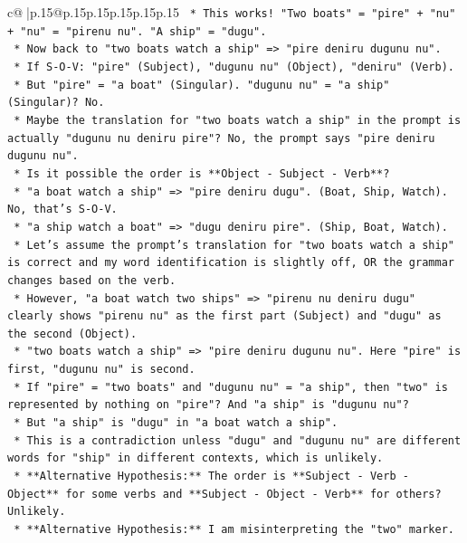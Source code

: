 \documentclass{article}
\begin{document}
{\begin{supertabular}{c@{$\;$}|p{.15\linewidth}@{}p{.15\linewidth}p{.15\linewidth}p{.15\linewidth}p{.15\linewidth}p{.15\linewidth}}
{{{\texttt{        *   This works! "Two boats" = "pire" + "nu" + "nu" = "pirenu nu". "A ship" = "dugu".} \\
\texttt{        *   Now back to "two boats watch a ship" => "pire deniru dugunu nu".} \\
\texttt{        *   If S{-}O{-}V: "pire" (Subject), "dugunu nu" (Object), "deniru" (Verb).} \\
\texttt{        *   But "pire" = "a boat" (Singular). "dugunu nu" = "a ship" (Singular)? No.} \\
\texttt{        *   Maybe the translation for "two boats watch a ship" in the prompt is actually "dugunu nu deniru pire"? No, the prompt says "pire deniru dugunu nu".} \\
\texttt{        *   Is it possible the order is **Object {-} Subject {-} Verb**?} \\
\texttt{        *   "a boat watch a ship" => "pire deniru dugu". (Boat, Ship, Watch). No, that's S{-}O{-}V.} \\
\texttt{        *   "a ship watch a boat" => "dugu deniru pire". (Ship, Boat, Watch).} \\
\texttt{        *   Let's assume the prompt's translation for "two boats watch a ship" is correct and my word identification is slightly off, OR the grammar changes based on the verb.} \\
\texttt{        *   However, "a boat watch two ships" => "pirenu nu deniru dugu" clearly shows "pirenu nu" as the first part (Subject) and "dugu" as the second (Object).} \\
\texttt{        *   "two boats watch a ship" => "pire deniru dugunu nu". Here "pire" is first, "dugunu nu" is second.} \\
\texttt{        *   If "pire" = "two boats" and "dugunu nu" = "a ship", then "two" is represented by nothing on "pire"? And "a ship" is "dugunu nu"?} \\
\texttt{        *   But "a ship" is "dugu" in "a boat watch a ship".} \\
\texttt{        *   This is a contradiction unless "dugu" and "dugunu nu" are different words for "ship" in different contexts, which is unlikely.} \\
\texttt{        *   **Alternative Hypothesis:** The order is **Subject {-} Verb {-} Object** for some verbs and **Subject {-} Object {-} Verb** for others? Unlikely.} \\
\texttt{        *   **Alternative Hypothesis:** I am misinterpreting the "two" marker.} \\
}}}
\end{supertabular}}
\end{document}

